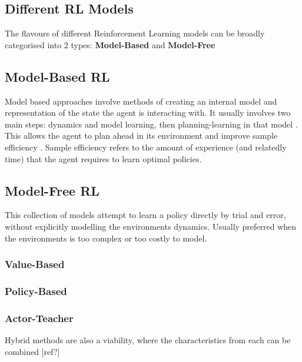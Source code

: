 
\subsection{Different RL Models}
  The flavours of different Reinforcement Learning models can be broadly categorised into 2 types: \textbf{Model-Based} and \textbf{Model-Free}


\subsection{Model-Based RL}
  Model based approaches involve methods of creating an internal model and representation of the state the agent is interacting with. It usually involves two main steps: dynamics and model learning, then planning-learning in that model \cite{MAL-086}. This allows the agent to plan ahead in its environment and improve sample efficiency \cite{wu23robotLearn,liu2021DRLminireview}. Sample efficiency refers to the amount of experience (and relatedly time) that the agent requires to learn optimal policies.




\subsection{Model-Free RL}
  This collection of models attempt to learn a policy directly by trial and error, without explicitly modelling the environments dynamics. Usually preferred when the environments is too complex or too costly to model.
  \subsubsection{Value-Based}
  \subsubsection{Policy-Based}
  \subsubsection{Actor-Teacher}

  Hybrid methods are also a viability, where the characteristics from each can be combined [ref?]
